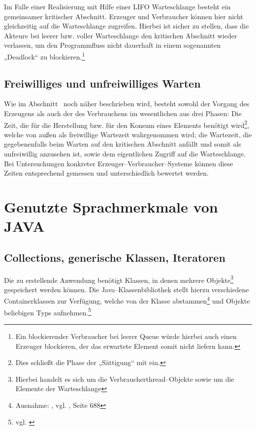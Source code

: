 Im Falle einer Realisierung mit Hilfe einer \ac{LIFO} Warteschlange besteht ein gemeinsamer kritischer Abschnitt. Erzeuger und Verbraucher können hier nicht gleichzeitig auf die Warteschlange zugreifen. Hierbei ist sicher zu stellen, dass die Akteure bei leerer bzw. voller Warteschlange den kritischen Abschnitt wieder verlassen, um den Programmfluss nicht dauerhaft in einem sogenannten „Deadlock“ zu blockieren.\footnote{Ein blockierender Verbraucher bei leerer Queue würde hierbei auch einen Erzeuger blockieren, der das erwartete Element somit nicht liefern kann.}

\subsection{Freiwilliges und unfreiwilliges Warten} %
\label{sub:freiwilliges_und_unfreiwilliges_warten}

Wie im Abschnitt~ noch näher beschrieben wird, besteht sowohl der Vorgang des Erzeugens als auch der des Verbrauchens im wesentlichen aus drei Phasen: Die Zeit, die für die Herstellung bzw. für den Konsum eines Elements benötigt wird\footnote{Dies schließt die Phase der „Sättigung“ mit ein.}, welche von außen als freiwillige Wartezeit wahrgenommen wird; die Wartezeit, die gegebenenfalls beim Warten auf den kritischen Abschnitt anfällt und somit als unfreiwillig anzusehen ist, sowie dem eigentlichen Zugriff auf die Warteschlange. Bei Untersuchungen konkreter Erzeuger–Verbraucher–Systeme können diese Zeiten entsprechend gemessen und unterschiedlich bewertet werden.



\newpage
\section{Genutzte Sprachmerkmale von JAVA} %
\label{sec:genutzte_sprachmerkmale_von_java}

\subsection{Collections, generische Klassen, Iteratoren} %
\label{sub:generics}
Die zu erstellende Anwendung benötigt Klassen, in denen mehrere Objekte\footnote{Hierbei handelt es sich um die Verbraucherthread–Objekte sowie um die Elemente der Warteschlange} gespeichert werden können. Die Java–Klassenbibliothek stellt hierzu verschiedene Containerklassen zur Verfügung, welche von der Klasse  abstammen\footnote{Ausnahme: , vgl. \cite{javaorange}, Seite 688} und Objekte beliebigen Typs aufnehmen.\footnote{vgl. \cite{javadoc:collection}}

